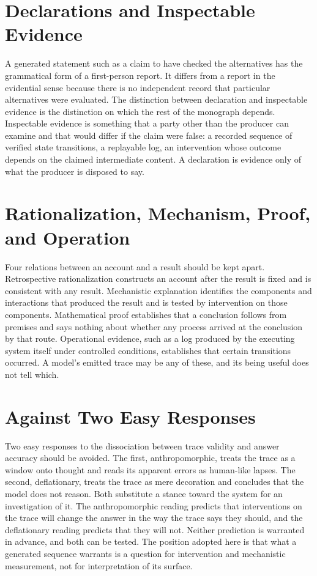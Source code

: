 \section{Declarations and Inspectable Evidence}

A generated statement such as a claim to have checked the alternatives has the grammatical form of a first-person report. It differs from a report in the evidential sense because there is no independent record that particular alternatives were evaluated. The distinction between declaration and inspectable evidence is the distinction on which the rest of the monograph depends. Inspectable evidence is something that a party other than the producer can examine and that would differ if the claim were false: a recorded sequence of verified state transitions, a replayable log, an intervention whose outcome depends on the claimed intermediate content. A declaration is evidence only of what the producer is disposed to say.

\section{Rationalization, Mechanism, Proof, and Operation}

Four relations between an account and a result should be kept apart. Retrospective rationalization constructs an account after the result is fixed and is consistent with any result. Mechanistic explanation identifies the components and interactions that produced the result and is tested by intervention on those components. Mathematical proof establishes that a conclusion follows from premises and says nothing about whether any process arrived at the conclusion by that route. Operational evidence, such as a log produced by the executing system itself under controlled conditions, establishes that certain transitions occurred. A model's emitted trace may be any of these, and its being useful does not tell which.

\section{Against Two Easy Responses}

Two easy responses to the dissociation between trace validity and answer accuracy should be avoided. The first, anthropomorphic, treats the trace as a window onto thought and reads its apparent errors as human-like lapses. The second, deflationary, treats the trace as mere decoration and concludes that the model does not reason. Both substitute a stance toward the system for an investigation of it. The anthropomorphic reading predicts that interventions on the trace will change the answer in the way the trace says they should, and the deflationary reading predicts that they will not. Neither prediction is warranted in advance, and both can be tested. The position adopted here is that what a generated sequence warrants is a question for intervention and mechanistic measurement, not for interpretation of its surface.

